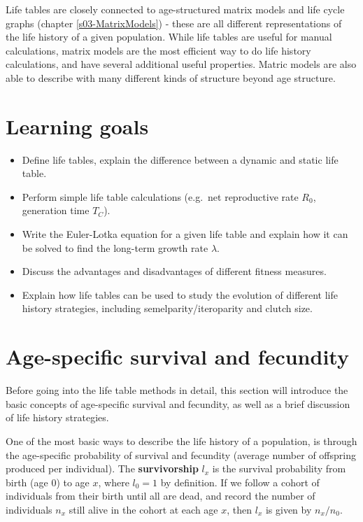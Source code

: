 \documentclass[
]{book}
\begin{document}
Life tables are closely connected to age-structured matrix models and life cycle graphs (chapter \ref{s03-MatrixModels}) - these are all different representations of the life history of a given population. While life tables are useful for manual calculations, matrix models are the most efficient way to do life history calculations, and have several additional useful properties. Matric models are also able to describe with many different kinds of structure beyond age structure.

\hypertarget{learning-goals-1}{%
\section{Learning goals}\label{learning-goals-1}}

\begin{itemize}
\item
  Define life tables, explain the difference between a dynamic and static life table.
\item
  Perform simple life table calculations (e.g.~net reproductive rate \(R_0\), generation time \(T_C\)).
\item
  Write the Euler-Lotka equation for a given life table and explain how it can be solved to find the long-term growth rate \(\lambda\).
\item
  Discuss the advantages and disadvantages of different fitness measures.
\item
  Explain how life tables can be used to study the evolution of different life history strategies, including semelparity/iteroparity and clutch size.
\end{itemize}

\hypertarget{age-specific-survival-and-fecundity}{%
\section{Age-specific survival and fecundity}\label{age-specific-survival-and-fecundity}}

Before going into the life table methods in detail, this section will introduce the basic concepts of age-specific survival and fecundity, as well as a brief discussion of life history strategies.

One of the most basic ways to describe the life history of a population, is through the age-specific probability of survival and fecundity (average number of offspring produced per individual). The \textbf{survivorship} \(l_x\) is the survival probability from birth (age 0) to age \(x\), where \(l_0=1\) by definition. If we follow a cohort of individuals from their birth until all are dead, and record the number of individuals \(n_x\) still alive in the cohort at each age \(x\), then \(l_x\) is given by \(n_x/n_0\).
\end{document}
